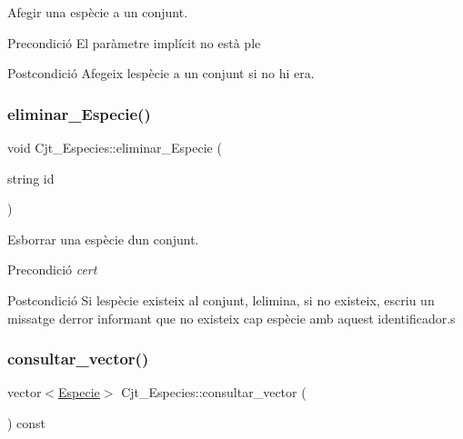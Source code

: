 Afegir una espècie a un conjunt. 

\begin{DoxyPrecond}{Precondició}
El paràmetre implícit no està ple 
\end{DoxyPrecond}
\begin{DoxyPostcond}{Postcondició}
Afegeix l\textquotesingle{}espècie a un conjunt si no hi era. 
\end{DoxyPostcond}
\mbox{\label{class_cjt___especies_af1259ace6df2a61d5c443a906a2f0a44}} 
\subsubsection{\texorpdfstring{eliminar\+\_\+\+Especie()}{eliminar\_Especie()}}
{\footnotesize\ttfamily void Cjt\+\_\+\+Especies\+::eliminar\+\_\+\+Especie (\begin{DoxyParamCaption}\item[{string}]{id }\end{DoxyParamCaption})}



Esborrar una espècie d\textquotesingle{}un conjunt. 

\begin{DoxyPrecond}{Precondició}
{\itshape cert} 
\end{DoxyPrecond}
\begin{DoxyPostcond}{Postcondició}
Si l\textquotesingle{}espècie existeix al conjunt, l\textquotesingle{}elimina, si no existeix, escriu un missatge d\textquotesingle{}error informant que no existeix cap espècie amb aquest identificador.\+s 
\end{DoxyPostcond}
\mbox{\label{class_cjt___especies_a36c1c182c1a1c9892c96a18153e9dd05}} 
\subsubsection{\texorpdfstring{consultar\+\_\+vector()}{consultar\_vector()}}
{\footnotesize\ttfamily vector$<$\hyperlink{class_especie}{Especie}$>$ Cjt\+\_\+\+Especies\+::consultar\+\_\+vector (\begin{DoxyParamCaption}{ }\end{DoxyParamCaption}) const}



